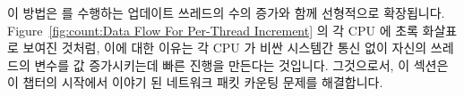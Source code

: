 이 방법은  를 수행하는 업데이트 쓰레드의 수의 증가와 함께
선형적으로 확장됩니다.
Figure~\ref{fig:count:Data Flow For Per-Thread Increment}
의 각 CPU 에 초록 화살표로 보여진 것처럼, 이에 대한 이유는 각 CPU 가 비싼
시스템간 통신 없이 자신의 쓰레드의 변수를 값 증가시키는데 빠른 진행을 만든다는
것입니다.
그것으로서, 이 섹션은 이 챕터의 시작에서 이야기 된 네트워크 패킷 카운팅 문제를
해결합니다.

